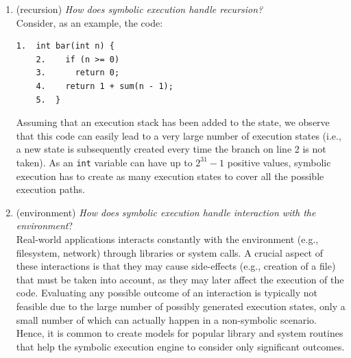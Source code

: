 \begin{enumerate}
  \item (recursion) {\em How does symbolic execution handle recursion?} \\
  Consider, as an example, the code:
    \begin{lstlisting}[basicstyle=\ttfamily\small]
    1.  int bar(int n) {
    2.    if (n >= 0) 
    3.      return 0;
    4.    return 1 + sum(n - 1);
    5.  }
    \end{lstlisting}
  Assuming that an execution stack has been added to the state, we observe that this code can easily lead to a very large number of execution states (i.e., a new state is subsequently created every time the branch on line 2 is not taken). As an {\tt int} variable can have up to  $2^{31} - 1$ positive values, symbolic execution has to create as many execution states to cover all the possible execution paths.
 
  \item (environment) {\em How does symbolic execution handle interaction with the environment}? \\
  Real-world applications interacts constantly with the environment (e.g., filesystem, network) through libraries or system calls. A crucial aspect of these interactions is that they may cause side-effects
(e.g., creation of a file)
that must be taken into account, as they may later affect the 
execution of the code. Evaluating any possible outcome of an interaction is typically not feasible due to the large number of possibly generated execution states, only a small number of which can actually happen in a non-symbolic scenario. Hence, it is common to create models for popular library and system routines that help the symbolic execution engine to consider only significant outcomes.


\end{enumerate}
